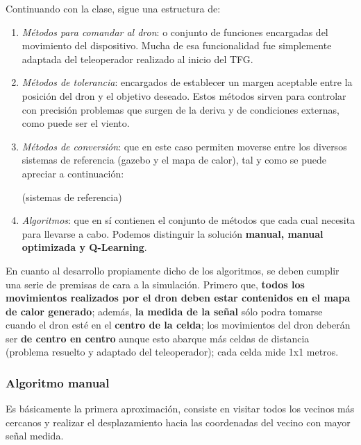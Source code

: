 Continuando con la clase, sigue una estructura de:

\begin{enumerate}
	\item \emph{Métodos para comandar al dron}: o conjunto de funciones encargadas del movimiento del dispositivo. Mucha de esa funcionalidad fue simplemente adaptada del teleoperador realizado al inicio del \ac{TFG}.

    \item \emph{Métodos de tolerancia}: encargados de establecer un margen aceptable entre la posición del dron y el objetivo deseado. Estos métodos sirven para controlar con precisión problemas que surgen de la deriva y de condiciones externas, como puede ser el viento.

	\item \emph{Métodos de conversión}: que en este caso permiten moverse entre los diversos sistemas de referencia (gazebo y el mapa de calor), tal y como se puede apreciar a continuación:

    (sistemas de referencia)\\

    \item \emph{Algoritmos}: que en sí contienen el conjunto de métodos que cada cual necesita para llevarse a cabo. Podemos distinguir la solución \textbf{manual, manual optimizada y Q-Learning}.
\end{enumerate}

En cuanto al desarrollo propiamente dicho de los algoritmos, se deben cumplir una serie de premisas de cara a la simulación. Primero que, \textbf{todos los movimientos realizados por el dron deben estar contenidos en el mapa de calor generado}; además, \textbf{la medida de la señal} sólo podra tomarse cuando el dron esté en el \textbf{centro de la celda}; los movimientos del dron deberán ser \textbf{de centro en centro} aunque esto abarque más celdas de distancia (problema resuelto y adaptado del teleoperador); cada celda mide 1x1 metros.\\

\subsubsection{Algoritmo manual}
\label{subsec:alg-manual}

Es básicamente la primera aproximación, consiste en visitar todos los vecinos más cercanos y realizar el desplazamiento hacia las coordenadas del vecino con mayor señal medida.\\

